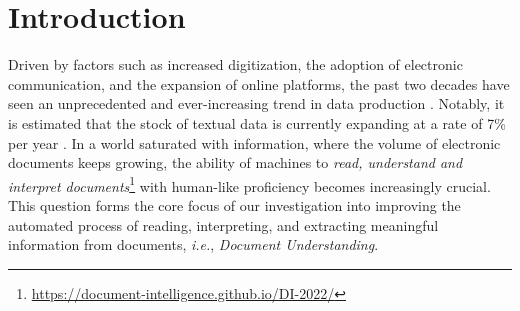 \chapter{Introduction}
\label{chapter:introduction}

\minitoc
{}



Driven by factors such as increased digitization, the adoption of electronic communication, and the expansion of online platforms, the past two decades have seen an unprecedented and ever-increasing trend in data production \citep{hilbert2011world, clissa2022survey}. Notably, it is estimated that the stock of textual data is currently expanding at a rate of 7\% per year \citep{villalobos2022will}. In a world saturated with information, where the volume of electronic documents keeps growing, the ability of machines to \textit{read, understand and interpret documents}\footnote{\url{https://document-intelligence.github.io/DI-2022/}} with human-like proficiency becomes increasingly crucial. This question forms the core focus of our investigation into improving the automated process of reading, interpreting, and extracting meaningful information from documents, \textit{i.e.}, \emph{Document Understanding}.


